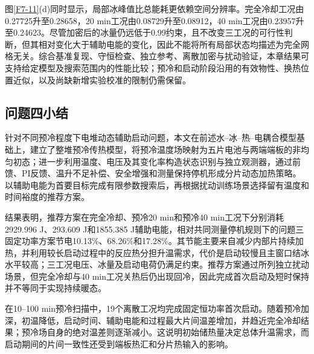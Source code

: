 图\ref{F7-11}(d)同时显示，局部冰峰值比总能耗更依赖空间分辨率。完全冷却工况由0.27725升至0.28658，20 min工况由0.08729升至0.08912，40 min工况由0.23957升至0.24623。尽管加密后的冰量仍远低于0.99约束，且不改变三工况的可行性判断，但其相对变化大于辅助电能的变化，因此不能将所有局部状态均描述为完全网格无关。综合基准复现、守恒检查、独立参考、离散加密与扰动验证，本章结果可支持给定模型及搜索范围内的性能比较；预冷和启动阶段沿用的有效物性、换热位置近似，以及尚缺新增实验校准的限制仍需保留。

\subsection{问题四小结}

针对不同预冷程度下电堆动态辅助启动问题，本文在前述水--冰--热--电耦合模型基础上，建立了整堆预冷传热模型，将预冷温度场映射为五片电池与两端端板的非均匀初态；进一步利用温度、电压及其变化率构造状态识别与独立观测器，通过前馈、PI反馈、温升不足补偿、安全增强和测量保持停机形成分片动态加热策略。以辅助电能为首要目标完成有限参数搜索后，再根据扰动训练场景选择留有温度和时间裕度的推荐方案。

结果表明，推荐方案在完全冷却、预冷20 min和预冷40 min工况下分别消耗2929.996 J、293.609 J和1855.385 J辅助电能，相对共同测量停机规则下的问题三固定功率方案节电10.13\%、68.26\%和17.28\%。其节能主要来自减少内部片持续加热，并利用较长启动过程中的反应热分担升温需求，代价是启动较慢且主窗口结冰水平较高；三工况电压、冰量及启动电荷仍满足约束。推荐方案通过所列独立扰动场景，但完全冷却与40 min工况关热后仍出现回冷，因此完成首次启动及短时保持并不等同于实现持续暖态。

在10--100 min预冷扫描中，19个离散工况均完成固定恒功率首次启动。随着预冷加深，初温降低，启动时间、辅助电能和过程最大片间温差增加，并趋近完全冷却结果；预冷场自身的绝对温差则逐渐减小。这说明初始储热量决定总体升温需求，而启动期间的片间一致性还受到端板热汇和分片热输入的影响。
